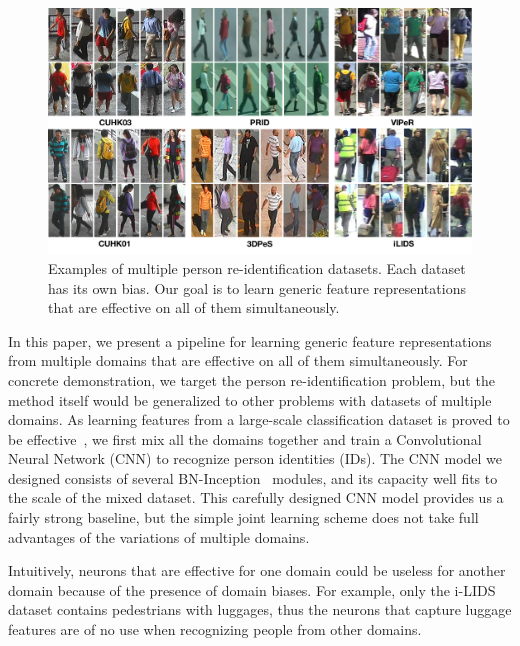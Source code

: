 \begin{figure}[t]
\begin{center}
\includegraphics[width=1.0\linewidth]{figures/multi_domain/reid_datasets.pdf}
\end{center}
\caption{Examples of multiple person re-identification datasets. Each dataset has its own bias. Our goal is to learn generic feature representations that are effective on all of them simultaneously.}
\label{fig:md-reid-datasets}
\end{figure}

In this paper, we present a pipeline for learning generic feature representations from multiple domains that are effective on all of them simultaneously. For concrete demonstration, we target the person re-identification problem, but the method itself would be generalized to other problems with datasets of multiple domains. As learning features from a large-scale classification dataset is proved to be effective~\cite{sun2014deep1}, we first mix all the domains together and train a Convolutional Neural Network (CNN) to recognize person identities (IDs). The CNN model we designed consists of several BN-Inception~\cite{szegedy2014going,ioffe2015batch} modules, and its capacity well fits to the scale of the mixed dataset. This carefully designed CNN model provides us a fairly strong baseline, but the simple joint learning scheme does not take full advantages of the variations of multiple domains.

Intuitively, neurons that are effective for one domain could be useless for another domain because of the presence of domain biases. For example, only the i-LIDS dataset contains pedestrians with luggages, thus the neurons that capture luggage features are of no use when recognizing people from other domains.

